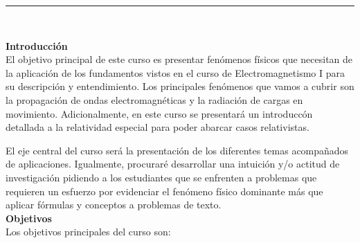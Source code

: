 \documentclass[letterpaper,10pt,onecolumn]{article}
\begin{document}




\noindent\rule{\textwidth}{1pt}\\[-0.1cm]

\addtocounter{mysection}{1}

\noindent\textbf{\large {} \quad Introducci\'on}\\[-0.2cm]


\noindent\normalsize El objetivo principal de este curso es presentar fen\'omenos
f\'isicos que necesitan de la aplicaci\'on de los fundamentos vistos
en el curso de Electromagnetismo I para su descripci\'on y
entendimiento. Los principales fen\'omenos que vamos a cubrir son la propagaci\'on
de ondas electromagn\'eticas y la radiaci\'on de cargas en
movimiento. Adicionalmente, en este curso se presentar\'a un
introducc\'on detallada a la relatividad especial para poder abarcar
casos relativistas.

El eje central del curso ser\'a la presentaci\'on de los diferentes
temas acompa\~nados de aplicaciones. Igualmente, procurar\'e
desarrollar una intuici\'on y/o actitud de investigaci\'on pidiendo a
los estudiantes que se enfrenten a problemas que requieren un
esfuerzo por evidenciar el fen\'omeno f\'isico dominante m\'as que
aplicar f\'ormulas y conceptos a problemas de texto.
\\[0.1cm]

\noindent\textbf{\large {} \quad Objetivos}\\[-0.2cm]

\noindent\normalsize Los objetivos principales del curso son:
\end{document}
